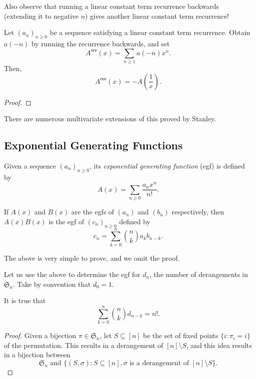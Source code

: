 	Also observe that running a linear constant term recurrence backwards (extending it to negative $n$) gives another linear constant term recurrence!

	\begin{ftheo}
	 	Let $(a_n)_{n \ge 0}$ be a sequence satisfying a linear constant term recurrence. Obtain $a(-n)$ by running the recurrence backwards, and set
	 	\[ A^\mathsf{rev}(x) = \sum_{n \ge 1} a(-n) x^n. \]
	 	Then,
	 	\[ A^\mathsf{rev}(x) = -A\left( \frac{1}{x} \right). \]
	 \end{ftheo}
	 \begin{proof}
	 	
	 \end{proof}

	 There are numerous multivariate extensions of this proved by Stanley.

\subsection{Exponential Generating Functions}

	\begin{fdef}
		Given a sequence $(a_n)_{n \ge 0}$, its \emph{exponential generating function} (egf) is defined by
		\[ A(x) = \sum_{n\ge 0} \frac{a_n x^n}{n!}. \]
	\end{fdef}

	\begin{flem}
		\label{lem: product of egfs}
		If $A(x)$ and $B(x)$ are the egfs of $(a_n)$ and $(b_n)$ respectively, then $A(x)B(x)$ is the egf of $(c_n)_{n \ge 0}$ defined by
		\[ c_n = \sum_{k=0}^n \binom{n}{k} a_k b_{n-k}. \]
	\end{flem}
	The above is very simple to prove, and we omit the proof.

	Let us use the above to determine the egf for $d_n$, the number of derangements in $\mathfrak{S}_n$. Take by convention that $d_0 = 1$.
	\begin{prop}
		It is true that
		\[ \sum_{k=0}^n \binom{n}{k} d_{n-k} = n!. \]
	\end{prop}
	\begin{proof}
		Given a bijection $\pi \in \mathfrak{S}_n$, let $S \subseteq [n]$ be the set of fixed points $\{ i : \pi_i = i \}$ of the permutation. This results in a derangement of $[n] \setminus S$, and this idea results in a bijection between
		\[ \mathfrak{S}_n \text{ and } \{ (S,\sigma) : S \subseteq [n], \sigma\text{ is a derangement of $[n] \setminus S$} \}. \]
	\end{proof}

